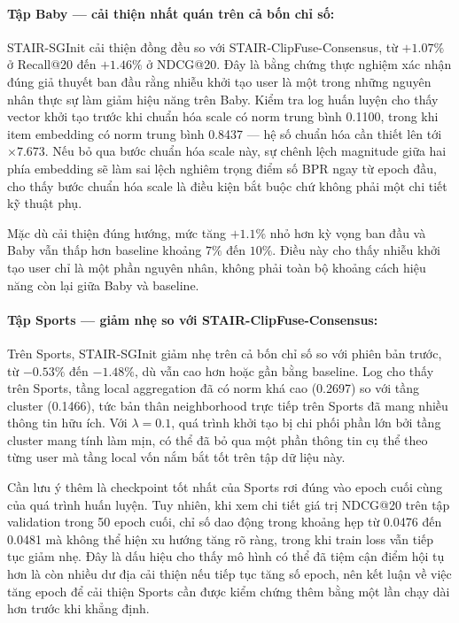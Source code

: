 \begin{longtable}
\paragraph{Tập Baby — cải thiện nhất quán trên cả bốn chỉ số:}
STAIR-SGInit cải thiện đồng đều so với STAIR-ClipFuse-Consensus, từ $+1.07\%$ ở Recall@20 đến $+1.46\%$ ở NDCG@20. Đây là bằng chứng thực nghiệm xác nhận đúng giả thuyết ban đầu rằng nhiễu khởi tạo user là một trong những nguyên nhân thực sự làm giảm hiệu năng trên Baby. Kiểm tra log huấn luyện cho thấy vector khởi tạo trước khi chuẩn hóa scale có norm trung bình 0.1100, trong khi item embedding có norm trung bình 0.8437 — hệ số chuẩn hóa cần thiết lên tới $\times 7.673$. Nếu bỏ qua bước chuẩn hóa scale này, sự chênh lệch magnitude giữa hai phía embedding sẽ làm sai lệch nghiêm trọng điểm số BPR ngay từ epoch đầu, cho thấy bước chuẩn hóa scale là điều kiện bắt buộc chứ không phải một chi tiết kỹ thuật phụ.
 
Mặc dù cải thiện đúng hướng, mức tăng $+1.1\%$ nhỏ hơn kỳ vọng ban đầu và Baby vẫn thấp hơn baseline khoảng $7\%$ đến $10\%$. Điều này cho thấy nhiễu khởi tạo user chỉ là một phần nguyên nhân, không phải toàn bộ khoảng cách hiệu năng còn lại giữa Baby và baseline.
 
\paragraph{Tập Sports — giảm nhẹ so với STAIR-ClipFuse-Consensus:}
Trên Sports, STAIR-SGInit giảm nhẹ trên cả bốn chỉ số so với phiên bản trước, từ $-0.53\%$ đến $-1.48\%$, dù vẫn cao hơn hoặc gần bằng baseline. Log cho thấy trên Sports, tầng local aggregation đã có norm khá cao (0.2697) so với tầng cluster (0.1466), tức bản thân neighborhood trực tiếp trên Sports đã mang nhiều thông tin hữu ích. Với $\lambda = 0.1$, quá trình khởi tạo bị chi phối phần lớn bởi tầng cluster mang tính làm mịn, có thể đã bỏ qua một phần thông tin cụ thể theo từng user mà tầng local vốn nắm bắt tốt trên tập dữ liệu này.
 
Cần lưu ý thêm là checkpoint tốt nhất của Sports rơi đúng vào epoch cuối cùng của quá trình huấn luyện. Tuy nhiên, khi xem chi tiết giá trị NDCG@20 trên tập validation trong 50 epoch cuối, chỉ số dao động trong khoảng hẹp từ 0.0476 đến 0.0481 mà không thể hiện xu hướng tăng rõ ràng, trong khi train loss vẫn tiếp tục giảm nhẹ. Đây là dấu hiệu cho thấy mô hình có thể đã tiệm cận điểm hội tụ hơn là còn nhiều dư địa cải thiện nếu tiếp tục tăng số epoch, nên kết luận về việc tăng epoch để cải thiện Sports cần được kiểm chứng thêm bằng một lần chạy dài hơn trước khi khẳng định.
 

\end{longtable}
